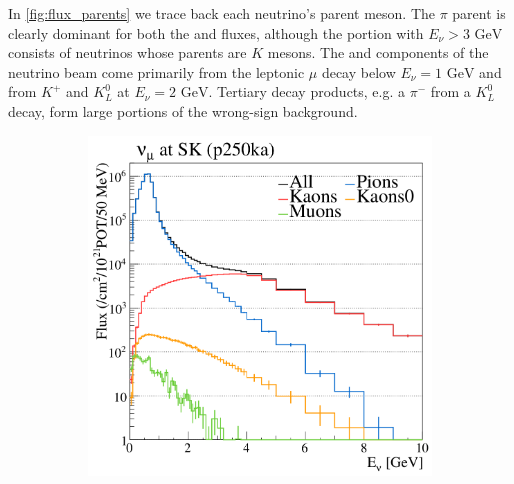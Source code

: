 In \autoref{fig:flux_parents} we trace back each neutrino's parent meson. The $\pi$ parent is clearly dominant for both the \numu and \numubar fluxes, although the portion with $E_\nu > 3\text{ GeV}$ consists of neutrinos whose parents are $K$ mesons. The \nue and \nuebar components of the neutrino beam come primarily from the leptonic $\mu$ decay below $E_\nu = 1 \text{ GeV}$ and from $K^+$ and $K^0_L$ at $E_\nu = 2 \text{ GeV}$. Tertiary decay products, e.g. a $\pi^-$ from a $K^0_L$ decay, form large portions of the wrong-sign background.
\begin{figure}[h]
	\begin{subfigure}[t]{0.32\textwidth}
		\includegraphics[width=\textwidth, trim={0mm 0mm 0mm 0mm}, clip,page=1]{figures/det_chap/beam/numu_sk_parents}
	\end{subfigure}
	\begin{subfigure}[t]{0.32\textwidth}

\end{subfigure}
\end{figure}
